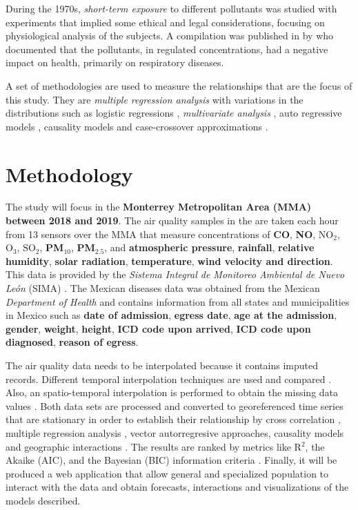 \documentclass[
  11pt,
  a4paper,
  oneside
]{article}
\begin{document}
During the 1970s, {\em short-term exposure} to different pollutants was studied \citep{HackneyEA1975, EhrlichEA1977, HackneyEA1978, LinnEA1978} with experiments that implied some ethical and legal considerations,  focusing on physiological analysis of the subjects. A compilation was published in by \citeauthor{Ferris1978} who documented that the pollutants, in regulated concentrations, had a negative impact on health, primarily on respiratory diseases.

A set of methodologies are used to measure the relationships that are the focus of this study. They are \emph{multiple regression analysis} \citep{Hyndman2018, Lebowitz1973, hasselblad1978, hatzakisEA1986} with variations in the distributions such as logistic regressions \citep{Korn1979}, \emph{multivariate analysis} \citep{LaveEA1973, gottinger1983}, auto regressive models \citep{WeiEA1991}, causality models \citep{popescuEA2013} and case-crossover approximations \citep{Maclure1991, carracedoMartinezEA2009}.

\section{Methodology}
The study will focus in the \textbf{Monterrey Metropolitan Area (MMA) between 2018 and 2019}. The air quality samples in the are taken each hour from 13 sensors over the MMA that measure concentrations of \textbf{CO}, \textbf{NO}, \textbf{$\text{NO}_2$}, \textbf{$\text{O}_3$}, \textbf{$\text{SO}_2$}, \textbf{PM$_{10}$}, \textbf{PM$_{2.5}$}, and \textbf{atmospheric pressure}, \textbf{rainfall}, \textbf{relative humidity}, \textbf{solar radiation}, \textbf{temperature}, \textbf{wind velocity and direction}. This data is provided by the \textit{Sistema Integral de Monitoreo Ambiental de Nuevo León} (SIMA) \citep{aireNL}. The Mexican diseases data was obtained from the Mexican \textit{Department of Health} \citep{egresos} and contains information from all states and municipalities in Mexico such as \textbf{date of admission}, \textbf{egress date}, \textbf{age at the admission}, \textbf{gender}, \textbf{weight}, \textbf{height}, \textbf{ICD code upon arrived}, \textbf{ICD code upon diagnosed}, \textbf{reason of egress}.

The air quality data needs to be interpolated because it contains imputed records. Different temporal interpolation techniques are used and compared \citep{Friedman1962}. Also, an spatio-temporal interpolation is performed to obtain the missing data values \citep{LiEA2002}. Both data sets are processed and converted to georeferenced time series \citep{Wei2019} that are stationary \citep{Hyndman2018} in order to establish their relationship by cross correlation \citep{derrickEA2004}, multiple regression analysis \citep{Brockwell2002}, vector autorregresive approaches, causality models \citep{popescuEA2013} and geographic interactions \citep{ComberEA2019}. The results are ranked by metrics like R$^2$, the Akaike (AIC), and the Bayesian (BIC) information criteria \citep{Albert2007}. Finally, it will be produced a web application that allow general and specialized population to interact with the data and obtain forecasts, interactions and visualizations of the models described.
\end{document}

